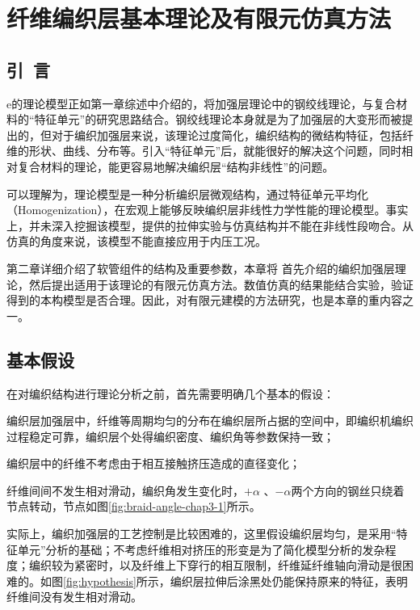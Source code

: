 
\chapter{纤维编织层基本理论及有限元仿真方法}


\section{引~言}


e\hacite 的理论模型正如第一章综述中介绍的，将加强层理论中的钢绞线理论，与复合材料的“特征单元”的研究思路结合。钢绞线理论本身就是为了加强层的大变形而被提出的，但对于编织加强层来说，该理论过度简化，编织结构的微结构特征，包括纤维的形状、曲线、分布等。引入“特征单元”后，就能很好的解决这个问题，同时相对复合材料的理论，能更容易地解决编织层“结构非线性”的问题。

可以理解为，\ha 理论模型是一种分析编织层微观结构，通过特征单元平均化（Homogenization），在宏观上能够反映编织层非线性力学性能的理论模型。事实上，\ha 并未深入挖掘该模型，提供的拉伸实验与仿真结构并不能在非线性段吻合。从仿真的角度来说，该模型不能直接应用于内压工况。

第二章详细介绍了软管组件的结构及重要参数，本章将 首先介绍\ha  的编织加强层理论，然后提出适用于该理论的有限元仿真方法。数值仿真的结果能结合实验，验证得到的本构模型是否合理。因此，对有限元建模的方法研究，也是本章的重内容之一。



\section{基本假设}
在对编织结构进行理论分析之前，首先需要明确几个基本的假设：

\begin{compactenum}[\bf 假设1  ]
	\item 编织层加强层中，纤维等周期均匀的分布在编织层所占据的空间中，即编织机编织过程稳定可靠，编织层个处得编织密度、编织角等参数保持一致；
	\item 编织层中的纤维不考虑由于相互接触挤压造成的直径变化；
	\item 纤维间间不发生相对滑动，编织角发生变化时，$ +\alpha$  、$-\alpha $两个方向的钢丝只绕着节点转动，节点如图\ref{fig:braid-angle-chap3-1}所示。
\end{compactenum}

实际上，编织加强层的工艺控制是比较困难的，这里假设编织层均匀，是采用“特征单元”分析的基础；不考虑纤维相对挤压的形变是为了简化模型分析的发杂程度；编织较为紧密时，以及纤维上下穿行的相互限制，纤维延纤维轴向滑动是很困难的。如图\ref{fig:hypothesis}所示，编织层拉伸后涂黑处仍能保持原来的特征，表明纤维间没有发生相对滑动。

